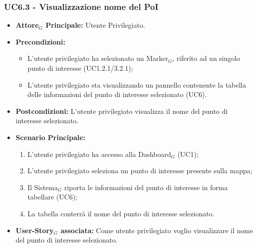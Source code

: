 \documentclass[10pt]{article}
\begin{document}
\begin{justify}
 \subsubsection{\textbf{UC6.3 - Visualizzazione nome del PoI}}
 \begin{itemize}
     \item \textbf{Attore$_G$ Principale:} Utente Privilegiato.
     \item \textbf{Precondizioni:}
       \begin{itemize}
    	        \item L'utente privilegiato ha selezionato un Marker$_G$, riferito ad un singolo punto di interesse (UC1.2.1/3.2.1);
          \item L'utente privilegiato sta visualizzando un pannello contenente la tabella delle informazioni del punto di interesse selezionato (UC6).
       \end{itemize}
     \item \textbf{Postcondizioni:} L'utente privilegiato visualizza il nome del punto di interesse selezionato.
     \item \textbf{Scenario Principale:}
        \begin{enumerate}
            \item L'utente privilegiato ha accesso alla Dashboard$_G$ (UC1);
            \item L'utente privilegiato seleziona un punto di interesse presente sulla mappa;
            \item Il Sistema$_G$ riporta le informazioni del punto di interesse in forma tabellare (UC6);
            \item La tabella conterrà il nome del punto di interesse selezionato.
        \end{enumerate}
     \item \textbf{User-Story$_G$ associata:} Come utente privilegiato voglio visualizzare il nome del punto di interesse selezionato. 
 \end{itemize}

\end{justify}
\end{document}
